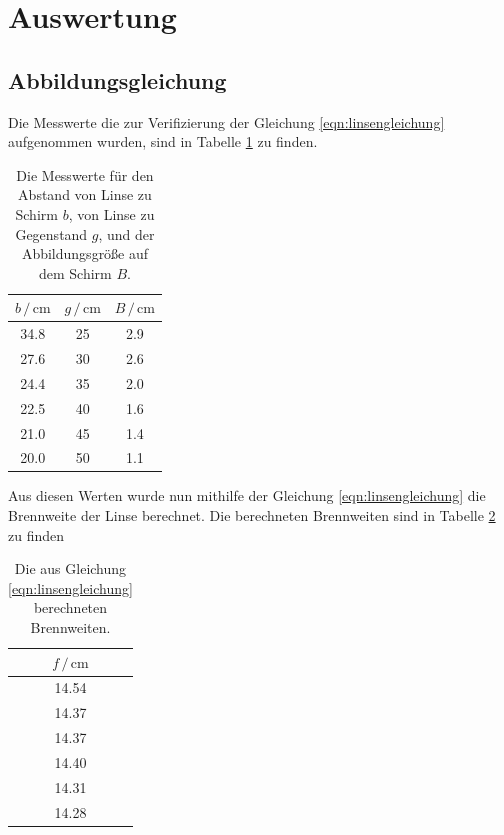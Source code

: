 \section{Auswertung}
\label{sec:Auswertung}
\subsection{Abbildungsgleichung}
Die Messwerte die zur Verifizierung der Gleichung \eqref{eqn:linsengleichung} aufgenommen wurden, sind in Tabelle \ref{tab:abbildung} zu finden.
\begin{table}
    \centering
    \begin{tabular}{ccc}
    \toprule
    $b \,/\, \si{\centi\meter}$ & $g \,/\, \si{\centi\meter}$ & $B \,/\, \si{\centi\meter}$ \\
    \midrule
    34.8 & 25 &  2.9 \\
    27.6 & 30 &  2.6 \\
    24.4 & 35 &  2.0 \\
    22.5 & 40 &  1.6 \\
    21.0 & 45 &  1.4 \\
    20.0 & 50 &  1.1 \\
    \bottomrule
    \end{tabular}
    \caption{Die Messwerte für den Abstand von Linse zu Schirm $b$, von Linse zu Gegenstand $g$, und der Abbildungsgröße auf dem Schirm $B$.}
\label{tab:abbildung}
\end{table}

Aus diesen Werten wurde nun mithilfe der Gleichung \eqref{eqn:linsengleichung} die Brennweite der Linse berechnet.
Die berechneten Brennweiten sind in Tabelle \ref{tab:brennweiten_bessel} zu finden

\begin{table}
    \centering
    \begin{tabular}{c}
    \toprule
    $f \,/\, \si{\centi\meter}$  \\
    \midrule
    14.54     \\
    14.37     \\
    14.37    \\
    14.40     \\
    14.31    \\
    14.28   \\
    \bottomrule
    \end{tabular}
    \caption{Die aus Gleichung \eqref{eqn:linsengleichung} berechneten Brennweiten.}
    \label{tab:brennweiten_bessel}
\end{table}

